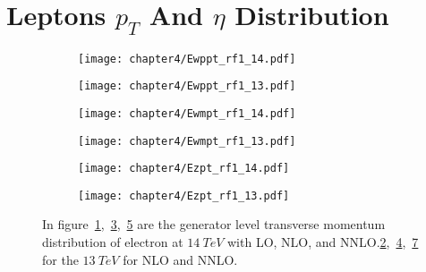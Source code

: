 \documentclass[a4paper,12pt]{report}
\numberwithin{equation}{section}
\begin{document}
\section{Leptons $p_{T}$ And $\eta$ Distribution}
\begin{figure}[H]
\centering
\begin{subfigure}{0.49\textwidth}
\texttt{[image: chapter4/Ewppt\_rf1\_14.pdf]}
\vspace*{-8mm}
\caption{}
\label{ept141}
\end{subfigure}
\begin{subfigure}{0.49\textwidth}
\texttt{[image: chapter4/Ewppt\_rf1\_13.pdf]}
\vspace*{-8mm}
\caption{}
\label{ept131}
\end{subfigure}
\begin{subfigure}{0.49\textwidth}
\texttt{[image: chapter4/Ewmpt\_rf1\_14.pdf]}
\vspace*{-8mm}
\caption{}
\label{ept142}
\end{subfigure}
\begin{subfigure}{0.49\textwidth}
\texttt{[image: chapter4/Ewmpt\_rf1\_13.pdf]}
\vspace*{-8mm}
\caption{}
\label{ept132}
\end{subfigure}
\begin{subfigure}{0.49\textwidth}
\texttt{[image: chapter4/Ezpt\_rf1\_14.pdf]}
\vspace*{-8mm}
\caption{}
\label{ept143}
\end{subfigure}
\begin{subfigure}{0.49\textwidth}
\texttt{[image: chapter4/Ezpt\_rf1\_13.pdf]}
\vspace*{-8mm}
\caption{}
\label{ept133}
\end{subfigure}
\caption{In figure~\ref{ept141},~\ref{ept142},~\ref{ept143} are the generator level transverse momentum distribution of electron at $14~TeV$ with LO, NLO, and NNLO.\ref{ept131},~\ref{ept132},~\ref{ept133} for the $13~TeV$ for NLO and NNLO.}  
\end{figure}
\end{document}
